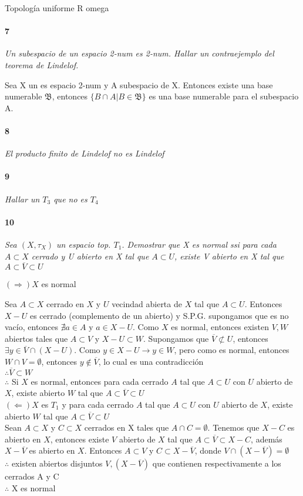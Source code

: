 \documentclass[12pt]{article}
\begin{document}
Topología uniforme R omega
\paragraph{7}
\textit{Un subespacio de un espacio 2-num es 2-num. Hallar un contraejemplo del teorema de Lindelof.}

Sea X un es espacio 2-num y A subespacio de X. Entonces existe una base numerable $\mathfrak{B}$, entonces $\{B\cap A | B\in\mathfrak{B}\}$ es una base numerable para el subespacio A.
\paragraph{8}
\textit{El producto finito de Lindelof no es Lindelof}

\paragraph{9}
\textit{Hallar un $T_3$ que no es $T_4$}

\paragraph{10}
\textit{Sea $(X,\tau_X)$ un  espacio top. $T_1$. Demostrar que X es normal ssi para cada $A\subset X$ cerrado y U abierto en X tal que $A\subset U$, existe V abierto en X tal que $A\subset\overline{V}\subset U$}

$(\Rightarrow ) X$ es normal 

Sea $A\subset X$ cerrado en $X$ y $U$ vecindad abierta de $X$ tal que $A\subset U$. Entonces $X-U$ es cerrado (complemento de un abierto) y S.P.G. supongamos que es no vacío, entonces $\nexists a\in A$ y $a\in X-U$. Como $X$ es normal, entonces existen $V,W$ abiertos tales que $A \subset V$ y $X-U\subset W$. Supongamos que $\overline{V}\not \subset U$, entonces $\exists y \in \overline{V}\cap(X-U)$. Como $y\in X-U \rightarrow y\in W$, pero como es normal, entonces $W \cap V=\emptyset$, entonces $y\notin \overline{V}$, lo cual es una contradicción
\\ $\therefore \overline{V}\subset W$
\\ $\therefore$ Si $X$ es normal, entonces para cada cerrado $A$ tal que $A \subset U$ con $U$ abierto de $X$, existe abierto $W$ tal que $A \subset \overline{V} \subset U$
\\$(\Leftarrow) X$ es $T_1$ y para cada cerrado $A$ tal que $A \subset U$ con $U$ abierto de $X$, existe abierto $W$ tal que $A \subset \overline{V} \subset U$
\\Sean $A\subset X$ y $C \subset X$ cerrados en X tales que $A \cap C =\emptyset$. Tenemos que $X-C$ es abierto en $X$, entonces existe $V$ abierto de $X$ tal que $A\subset \overline{V} \subset X-C$, además $X-\overline{V}$ es abierto en $X$. Entonces $A \subset V$ y $C \subset X-\overline{V}$, donde $V\cap(X-\overline{V})=\emptyset$
\\$\therefore$ existen abiertos disjuntos $V, (X-\overline{V})$ que contienen respectivamente a los cerrados A y C
\\$\therefore$ X es normal
\end{document}
